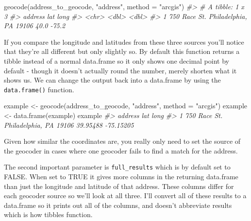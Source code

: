 \documentclass[
]{krantz}
\makeatletter
\newenvironment{Shaded}{\begin{snugshade}}{\end{snugshade}}
\newcommand{\AttributeTok}[1]{\textcolor[rgb]{0.61,0.61,0.61}{#1}}
\newcommand{\CommentTok}[1]{\textcolor[rgb]{0.37,0.37,0.37}{\textit{#1}}}
\newcommand{\FunctionTok}[1]{\textcolor[rgb]{0,0,0}{#1}}
\newcommand{\NormalTok}[1]{#1}
\newcommand{\OtherTok}[1]{\textcolor[rgb]{0.37,0.37,0.37}{#1}}
\newcommand{\StringTok}[1]{\textcolor[rgb]{0.5,0.5,0.5}{#1}}
\newenvironment{kframe}{%
\medskip{}
\setlength{\fboxsep}{.8em}
 \def\at@end@of@kframe{}%
 \ifinner\ifhmode%
  \def\at@end@of@kframe{\end{minipage}}%
  \begin{minipage}{\columnwidth}%
 \fi\fi%
 \def\FrameCommand##1{\hskip\@totalleftmargin \hskip-\fboxsep
 \colorbox{shadecolor}{##1}\hskip-\fboxsep
     \hskip-\linewidth \hskip-\@totalleftmargin \hskip\columnwidth}%
 \MakeFramed {\advance\hsize-\width
   \@totalleftmargin\z@ \linewidth\hsize
   \@setminipage}}%
 {\par\unskip\endMakeFramed%
 \at@end@of@kframe}
\renewenvironment{Shaded}{\begin{kframe}}{\end{kframe}}
\makeatother
\begin{document}
\begin{Shaded}
\begin{Highlighting}[]
\FunctionTok{geocode}\NormalTok{(address\_to\_geocode, }\StringTok{"address"}\NormalTok{, }\AttributeTok{method =} \StringTok{"arcgis"}\NormalTok{)}
\CommentTok{\#\textgreater{} \# A tibble: 1 x 3}
\CommentTok{\#\textgreater{}   address                               lat  long}
\CommentTok{\#\textgreater{}   \textless{}chr\textgreater{}                               \textless{}dbl\textgreater{} \textless{}dbl\textgreater{}}
\CommentTok{\#\textgreater{} 1 750 Race St. Philadelphia, PA 19106  40.0 {-}75.2}
\end{Highlighting}
\end{Shaded}

If you compare the longitude and latitudes from these three sources you'll notice that they're all different but only slightly so. By default this function returns a tibble instead of a normal data.frame so it only shows one decimal point by default - though it doesn't actually round the number, merely shorten what it shows us. We can change the output back into a data.frame by using the \texttt{data.frame()} function.

\begin{Shaded}
\begin{Highlighting}[]
\NormalTok{example }\OtherTok{\textless{}{-}} \FunctionTok{geocode}\NormalTok{(address\_to\_geocode, }\StringTok{"address"}\NormalTok{, }\AttributeTok{method =} \StringTok{"arcgis"}\NormalTok{)}
\NormalTok{example }\OtherTok{\textless{}{-}} \FunctionTok{data.frame}\NormalTok{(example)}
\NormalTok{example}
\CommentTok{\#\textgreater{}                               address      lat      long}
\CommentTok{\#\textgreater{} 1 750 Race St. Philadelphia, PA 19106 39.95488 {-}75.15205}
\end{Highlighting}
\end{Shaded}

Given how similar the coordinates are, you really only need to set the source of the geocoder in cases where one geocoder fails to find a match for the address.

The second important parameter is \texttt{full\_results} which is by default set to FALSE. When set to TRUE it gives more columns in the returning data.frame than just the longitude and latitude of that address. These columns differ for each geocoder source so we'll look at all three. I'll convert all of these results to a data.frame so it prints out all of the columns, and doesn't abbreviate results which is how tibbles function.
\end{document}
